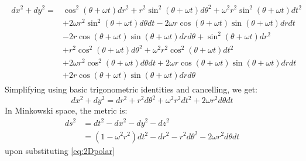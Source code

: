 \documentclass[11pt,a4paper]{article}
\begin{document}
\begin{align}
\begin{split}\label{eq:2}
dx^{2}+dy^{2} ={}& \cos^{2}(\theta + \omega t) dr^{2}+r^{2}\sin^{2}(\theta + \omega t)d\theta^{2}+\omega^{2}r^{2}\sin^{2}(\theta + \omega t)dt^{2} \\
&+ 2 \omega r^{2} \sin^{2}(\theta + \omega t)d \theta dt -2 \omega r \cos(\theta + \omega t)\sin(\theta + \omega t) dr dt\\
&-2 r \cos(\theta + \omega t)\sin(\theta + \omega t) dr d\theta +\sin^{2}(\theta + \omega t) dr^{2} \\
&+ r^{2}\cos^{2}(\theta + \omega t)d\theta^{2} + \omega^{2} r^{2} \cos^{2}(\theta + \omega t) dt^{2} \\
&+ 2 \omega r^{2} \cos^{2}(\theta + \omega t)d \theta dt +2 \omega r \cos(\theta + \omega t)\sin(\theta + \omega t) dr dt\\
&+2 r \cos(\theta + \omega t)\sin(\theta + \omega t) dr d\theta
\end{split}
\end{align}
Simplifying using basic trigonometric identities and cancelling, we get:
\begin{equation} \label{eq:2Dpolar}
dx^{2}+dy^{2} = dr^{2} + r^{2}d\theta^{2} + \omega^{2}r^{2}dt^{2}+2 \omega r^{2} d\theta dt
\end{equation}
In Minkowski space, the metric is:
\begin{align}
	ds^{2}&=dt^{2}-dx^{2}-dy^{2}-dz^{2}\\
	&=(1-\omega^{2}r^{2})dt^{2}-dr^{2} - r^{2}d\theta^{2} -2 \omega r^{2} d\theta dt
\end{align}
upon substituting \ref{eq:2Dpolar}
\end{document}
